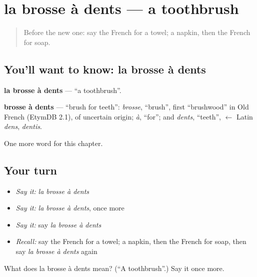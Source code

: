 \section[la brosse à dents]{la brosse à dents — a toothbrush}

\label{lesson:FR-C113-brosse-a-dents}



\begin{quote}
Before the new one: say the French for a towel; a napkin, then the French for soap.
\end{quote}

\subsection*{You'll want to know: la brosse à dents}
\textbf{la brosse à dents} — \textquotedblleft{}a toothbrush\textquotedblright{}.

\begin{cousinweb}
\textbf{brosse à dents} — \textquotedblleft{}brush for teeth\textquotedblright{}: \emph{brosse}, \textquotedblleft{}brush\textquotedblright{}, first \textquotedblleft{}brushwood\textquotedblright{} in Old French (EtymDB 2.1), of uncertain origin; \emph{à}, \textquotedblleft{}for\textquotedblright{}; and \emph{dents}, \textquotedblleft{}teeth\textquotedblright{}, $\leftarrow$ Latin \emph{dens}, \emph{dentis}.
\end{cousinweb}

\begin{grammarlens}[title={What you've built}]
One more word for this chapter.
\end{grammarlens}

\subsection*{Your turn}
\begin{itemize}
\raggedright
  \item \emph{Say it:} \emph{la brosse à dents}
  \item \emph{Say it:} \emph{la brosse à dents}, once more
  \item \emph{Say it:} say \emph{la brosse à dents}
  \item \emph{Recall:} say the French for a towel; a napkin, then the French for soap, then say \emph{la brosse à dents} again
\end{itemize}

\begin{tcolorbox}[breakable,colback=teal!4,colframe=teal!35!black,title={Before you move on}]
What does la brosse à dents mean? (\textquotedblleft{}A toothbrush\textquotedblright{}.) Say it once more.
\end{tcolorbox}
